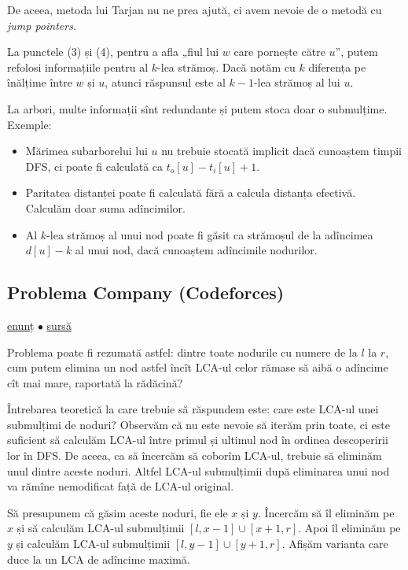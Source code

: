 \documentclass[../main.tex]{subfiles}
\begin{document}
De aceea, metoda lui Tarjan nu ne prea ajută, ci avem nevoie de o metodă cu \textit{jump pointers}.

La punctele (3) și (4), pentru a afla „fiul lui $w$ care pornește către $u$”, putem refolosi informațiile pentru al $k$-lea strămoș. Dacă notăm cu $k$ diferența pe înălțime între $w$ și $u$, atunci răspunsul este al $k-1$-lea strămoș al lui $u$.

La arbori, multe informații sînt redundante și putem stoca doar o submulțime. Exemple:

\begin{itemize}
  \item Mărimea subarborelui lui $u$ nu trebuie stocată implicit dacă cunoaștem timpii DFS, ci poate fi calculată ca $t_o[u]-t_i[u]+1$.

  \item Paritatea distanței poate fi calculată fără a calcula distanța efectivă. Calculăm doar suma adîncimilor.

  \item Al $k$-lea strămoș al unui nod poate fi găsit ca strămoșul de la adîncimea $d[u]-k$ al unui nod, dacă cunoaștem adîncimile nodurilor.
\end{itemize}

\subsection{Problema Company (Codeforces)}
\label{problem:company}

\href{https://codeforces.com/contest/1062/problem/E}{enunț}
$\bullet$
\hyperref[code:company]{sursă}

Problema poate fi rezumată astfel: dintre toate nodurile cu numere de la $l$ la $r$, cum putem elimina un nod astfel încît LCA-ul celor rămase să aibă o adîncime cît mai mare, raportată la rădăcină?

Întrebarea teoretică la care trebuie să răspundem este: care este LCA-ul unei submulțimi de noduri? Observăm că nu este nevoie să iterăm prin toate, ci este suficient să calculăm LCA-ul între primul și ultimul nod în ordinea descoperirii lor în DFS. De aceea, ca să încercăm să coborîm LCA-ul, trebuie să eliminăm unul dintre aceste noduri. Altfel LCA-ul submulțimii după eliminarea unui nod va rămîne nemodificat față de LCA-ul original.

Să presupunem că găsim aceste noduri, fie ele $x$ și $y$. Încercăm să îl eliminăm pe $x$ și să calculăm LCA-ul submulțimii $[l,x-1] \cup [x+1,r]$. Apoi îl eliminăm pe $y$ și calculăm LCA-ul submulțimii $[l,y-1] \cup [y+1,r]$. Afișăm varianta care duce la un LCA de adîncime maximă.
\end{document}
